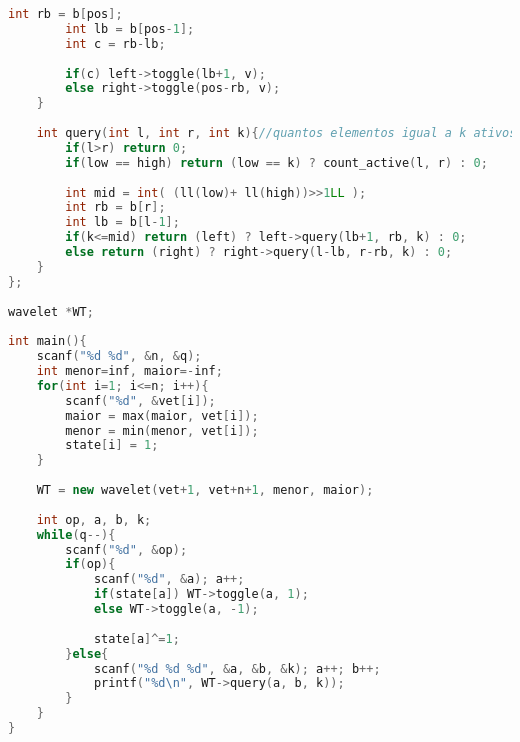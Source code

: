 \documentclass[12pt,a4paper,twoside]{report}
\begin{document}
\begin{lstlisting}[caption=Wavelet Tree + Toggle,language=C++]
        int rb = b[pos];
        int lb = b[pos-1];
        int c = rb-lb;
         
        if(c) left->toggle(lb+1, v);
        else right->toggle(pos-rb, v);
    }
     
    int query(int l, int r, int k){//quantos elementos igual a k ativos existem no intervalo
        if(l>r) return 0;
        if(low == high) return (low == k) ? count_active(l, r) : 0;
         
        int mid = int( (ll(low)+ ll(high))>>1LL );
        int rb = b[r];
        int lb = b[l-1];
        if(k<=mid) return (left) ? left->query(lb+1, rb, k) : 0;
        else return (right) ? right->query(l-lb, r-rb, k) : 0;
    }
};
 
wavelet *WT;
 
int main(){    
    scanf("%d %d", &n, &q);
    int menor=inf, maior=-inf;
    for(int i=1; i<=n; i++){
        scanf("%d", &vet[i]);
        maior = max(maior, vet[i]);
        menor = min(menor, vet[i]);
        state[i] = 1;
    }
     
    WT = new wavelet(vet+1, vet+n+1, menor, maior);
     
    int op, a, b, k;
    while(q--){
        scanf("%d", &op);
        if(op){
            scanf("%d", &a); a++;
            if(state[a]) WT->toggle(a, 1);
            else WT->toggle(a, -1);
             
            state[a]^=1;
        }else{
            scanf("%d %d %d", &a, &b, &k); a++; b++;
            printf("%d\n", WT->query(a, b, k));
        }
    }
}
\end{lstlisting}
\end{document}
